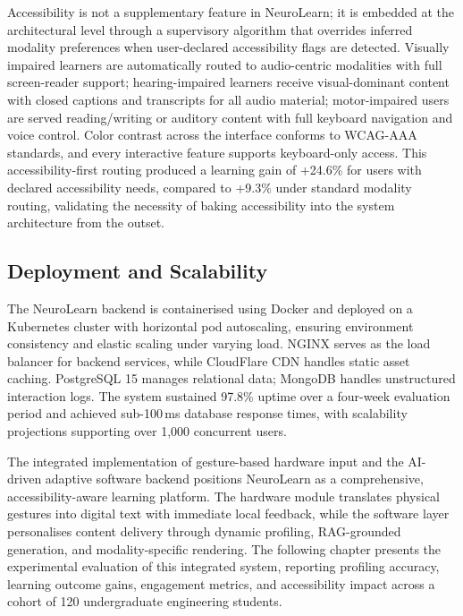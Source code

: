Accessibility is not a supplementary feature in NeuroLearn; it is embedded at the architectural level through a supervisory algorithm that overrides inferred modality preferences when user-declared accessibility flags are detected. Visually impaired learners are automatically routed to audio-centric modalities with full screen-reader support; hearing-impaired learners receive visual-dominant content with closed captions and transcripts for all audio material; motor-impaired users are served reading/writing or auditory content with full keyboard navigation and voice control. Color contrast across the interface conforms to WCAG-AAA standards, and every interactive feature supports keyboard-only access. This accessibility-first routing produced a learning gain of +24.6\% for users with declared accessibility needs, compared to +9.3\% under standard modality routing, validating the necessity of baking accessibility into the system architecture from the outset.

\subsection{Deployment and Scalability}

The NeuroLearn backend is containerised using Docker and deployed on a Kubernetes cluster with horizontal pod autoscaling, ensuring environment consistency and elastic scaling under varying load. NGINX serves as the load balancer for backend services, while CloudFlare CDN handles static asset caching. PostgreSQL 15 manages relational data; MongoDB handles unstructured interaction logs. The system sustained 97.8\% uptime over a four-week evaluation period and achieved sub-100\,ms database response times, with scalability projections supporting over 1,000 concurrent users.

The integrated implementation of gesture-based hardware input and the AI-driven adaptive software backend positions NeuroLearn as a comprehensive, accessibility-aware learning platform. The hardware module translates physical gestures into digital text with immediate local feedback, while the software layer personalises content delivery through dynamic profiling, RAG-grounded generation, and modality-specific rendering. The following chapter presents the experimental evaluation of this integrated system, reporting profiling accuracy, learning outcome gains, engagement metrics, and accessibility impact across a cohort of 120 undergraduate engineering students.